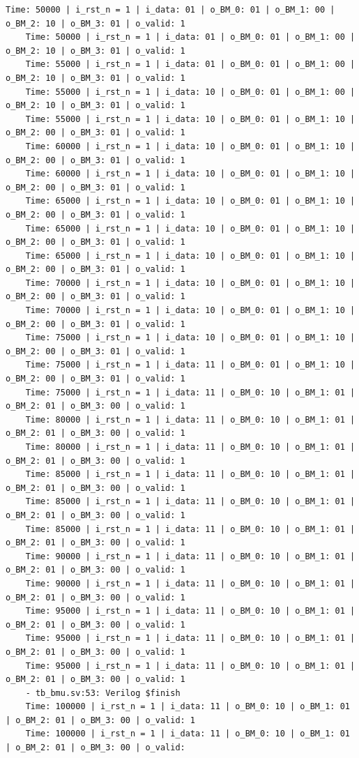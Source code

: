 \begin{lstlisting}[style=StyleResult, language=Result]
	Time: 50000 | i_rst_n = 1 | i_data: 01 | o_BM_0: 01 | o_BM_1: 00 | o_BM_2: 10 | o_BM_3: 01 | o_valid: 1
	Time: 50000 | i_rst_n = 1 | i_data: 01 | o_BM_0: 01 | o_BM_1: 00 | o_BM_2: 10 | o_BM_3: 01 | o_valid: 1
	Time: 55000 | i_rst_n = 1 | i_data: 01 | o_BM_0: 01 | o_BM_1: 00 | o_BM_2: 10 | o_BM_3: 01 | o_valid: 1
	Time: 55000 | i_rst_n = 1 | i_data: 10 | o_BM_0: 01 | o_BM_1: 00 | o_BM_2: 10 | o_BM_3: 01 | o_valid: 1
	Time: 55000 | i_rst_n = 1 | i_data: 10 | o_BM_0: 01 | o_BM_1: 10 | o_BM_2: 00 | o_BM_3: 01 | o_valid: 1
	Time: 60000 | i_rst_n = 1 | i_data: 10 | o_BM_0: 01 | o_BM_1: 10 | o_BM_2: 00 | o_BM_3: 01 | o_valid: 1
	Time: 60000 | i_rst_n = 1 | i_data: 10 | o_BM_0: 01 | o_BM_1: 10 | o_BM_2: 00 | o_BM_3: 01 | o_valid: 1
	Time: 65000 | i_rst_n = 1 | i_data: 10 | o_BM_0: 01 | o_BM_1: 10 | o_BM_2: 00 | o_BM_3: 01 | o_valid: 1
	Time: 65000 | i_rst_n = 1 | i_data: 10 | o_BM_0: 01 | o_BM_1: 10 | o_BM_2: 00 | o_BM_3: 01 | o_valid: 1
	Time: 65000 | i_rst_n = 1 | i_data: 10 | o_BM_0: 01 | o_BM_1: 10 | o_BM_2: 00 | o_BM_3: 01 | o_valid: 1
	Time: 70000 | i_rst_n = 1 | i_data: 10 | o_BM_0: 01 | o_BM_1: 10 | o_BM_2: 00 | o_BM_3: 01 | o_valid: 1
	Time: 70000 | i_rst_n = 1 | i_data: 10 | o_BM_0: 01 | o_BM_1: 10 | o_BM_2: 00 | o_BM_3: 01 | o_valid: 1
	Time: 75000 | i_rst_n = 1 | i_data: 10 | o_BM_0: 01 | o_BM_1: 10 | o_BM_2: 00 | o_BM_3: 01 | o_valid: 1
	Time: 75000 | i_rst_n = 1 | i_data: 11 | o_BM_0: 01 | o_BM_1: 10 | o_BM_2: 00 | o_BM_3: 01 | o_valid: 1
	Time: 75000 | i_rst_n = 1 | i_data: 11 | o_BM_0: 10 | o_BM_1: 01 | o_BM_2: 01 | o_BM_3: 00 | o_valid: 1
	Time: 80000 | i_rst_n = 1 | i_data: 11 | o_BM_0: 10 | o_BM_1: 01 | o_BM_2: 01 | o_BM_3: 00 | o_valid: 1
	Time: 80000 | i_rst_n = 1 | i_data: 11 | o_BM_0: 10 | o_BM_1: 01 | o_BM_2: 01 | o_BM_3: 00 | o_valid: 1
	Time: 85000 | i_rst_n = 1 | i_data: 11 | o_BM_0: 10 | o_BM_1: 01 | o_BM_2: 01 | o_BM_3: 00 | o_valid: 1
	Time: 85000 | i_rst_n = 1 | i_data: 11 | o_BM_0: 10 | o_BM_1: 01 | o_BM_2: 01 | o_BM_3: 00 | o_valid: 1
	Time: 85000 | i_rst_n = 1 | i_data: 11 | o_BM_0: 10 | o_BM_1: 01 | o_BM_2: 01 | o_BM_3: 00 | o_valid: 1
	Time: 90000 | i_rst_n = 1 | i_data: 11 | o_BM_0: 10 | o_BM_1: 01 | o_BM_2: 01 | o_BM_3: 00 | o_valid: 1
	Time: 90000 | i_rst_n = 1 | i_data: 11 | o_BM_0: 10 | o_BM_1: 01 | o_BM_2: 01 | o_BM_3: 00 | o_valid: 1
	Time: 95000 | i_rst_n = 1 | i_data: 11 | o_BM_0: 10 | o_BM_1: 01 | o_BM_2: 01 | o_BM_3: 00 | o_valid: 1
	Time: 95000 | i_rst_n = 1 | i_data: 11 | o_BM_0: 10 | o_BM_1: 01 | o_BM_2: 01 | o_BM_3: 00 | o_valid: 1
	Time: 95000 | i_rst_n = 1 | i_data: 11 | o_BM_0: 10 | o_BM_1: 01 | o_BM_2: 01 | o_BM_3: 00 | o_valid: 1
	- tb_bmu.sv:53: Verilog $finish
	Time: 100000 | i_rst_n = 1 | i_data: 11 | o_BM_0: 10 | o_BM_1: 01 | o_BM_2: 01 | o_BM_3: 00 | o_valid: 1
	Time: 100000 | i_rst_n = 1 | i_data: 11 | o_BM_0: 10 | o_BM_1: 01 | o_BM_2: 01 | o_BM_3: 00 | o_valid: 	
\end{lstlisting}


